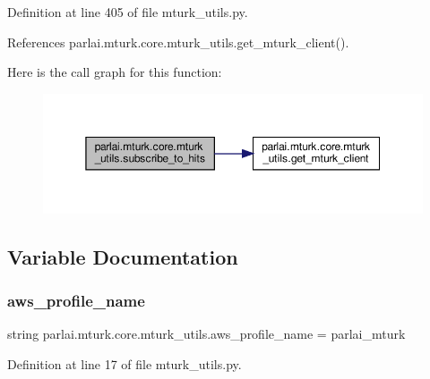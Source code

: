 Definition at line 405 of file mturk\+\_\+utils.\+py.



References parlai.\+mturk.\+core.\+mturk\+\_\+utils.\+get\+\_\+mturk\+\_\+client().

Here is the call graph for this function\+:
\nopagebreak
\begin{figure}[H]
\begin{center}
\leavevmode
\includegraphics[width=350pt]{namespaceparlai_1_1mturk_1_1core_1_1mturk__utils_accc5838e30ccf9ab95050ab11ac0d973_cgraph}
\end{center}
\end{figure}


\subsection{Variable Documentation}
\mbox{\label{namespaceparlai_1_1mturk_1_1core_1_1mturk__utils_acb7b9577d828e5c693ca1c20069c5d14}} 
\subsubsection{\texorpdfstring{aws\+\_\+profile\+\_\+name}{aws\_profile\_name}}
{\footnotesize\ttfamily string parlai.\+mturk.\+core.\+mturk\+\_\+utils.\+aws\+\_\+profile\+\_\+name = \textquotesingle{}parlai\+\_\+mturk\textquotesingle{}}



Definition at line 17 of file mturk\+\_\+utils.\+py.

\mbox{\label{namespaceparlai_1_1mturk_1_1core_1_1mturk__utils_a46a5a1362c84f2ab158459d11e5ff75b}} 
